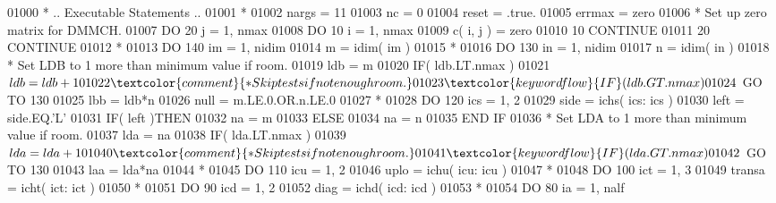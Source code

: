 \begin{DoxyCode}
01000 \textcolor{comment}{*     .. Executable Statements ..}
01001 \textcolor{comment}{*}
01002       nargs = 11
01003       nc = 0
01004       reset = .true.
01005       errmax = zero
01006 \textcolor{comment}{*     Set up zero matrix for DMMCH.}
01007       \textcolor{keywordflow}{DO} 20 j = 1, nmax
01008          \textcolor{keywordflow}{DO} 10 i = 1, nmax
01009             c( i, j ) = zero
01010    10    \textcolor{keywordflow}{CONTINUE}
01011    20 \textcolor{keywordflow}{CONTINUE}
01012 \textcolor{comment}{*}
01013       \textcolor{keywordflow}{DO} 140 im = 1, nidim
01014          m = idim( im )
01015 \textcolor{comment}{*}
01016          \textcolor{keywordflow}{DO} 130 in = 1, nidim
01017             n = idim( in )
01018 \textcolor{comment}{*           Set LDB to 1 more than minimum value if room.}
01019             ldb = m
01020             \textcolor{keywordflow}{IF}( ldb.LT.nmax )
01021      $         ldb = ldb + 1
01022 \textcolor{comment}{*           Skip tests if not enough room.}
01023             \textcolor{keywordflow}{IF}( ldb.GT.nmax )
01024      $         \textcolor{keywordflow}{GO TO} 130
01025             lbb = ldb*n
01026             null = m.LE.0.OR.n.LE.0
01027 \textcolor{comment}{*}
01028             \textcolor{keywordflow}{DO} 120 ics = 1, 2
01029                side = ichs( ics: ics )
01030                left = side.EQ.\textcolor{stringliteral}{'L'}
01031                \textcolor{keywordflow}{IF}( left )\textcolor{keywordflow}{THEN}
01032                   na = m
01033                \textcolor{keywordflow}{ELSE}
01034                   na = n
01035 \textcolor{keywordflow}{               END IF}
01036 \textcolor{comment}{*              Set LDA to 1 more than minimum value if room.}
01037                lda = na
01038                \textcolor{keywordflow}{IF}( lda.LT.nmax )
01039      $            lda = lda + 1
01040 \textcolor{comment}{*              Skip tests if not enough room.}
01041                \textcolor{keywordflow}{IF}( lda.GT.nmax )
01042      $            \textcolor{keywordflow}{GO TO} 130
01043                laa = lda*na
01044 \textcolor{comment}{*}
01045                \textcolor{keywordflow}{DO} 110 icu = 1, 2
01046                   uplo = ichu( icu: icu )
01047 \textcolor{comment}{*}
01048                   \textcolor{keywordflow}{DO} 100 ict = 1, 3
01049                      transa = icht( ict: ict )
01050 \textcolor{comment}{*}
01051                      \textcolor{keywordflow}{DO} 90 icd = 1, 2
01052                         diag = ichd( icd: icd )
01053 \textcolor{comment}{*}
01054                         \textcolor{keywordflow}{DO} 80 ia = 1, nalf

\end{DoxyCode}
